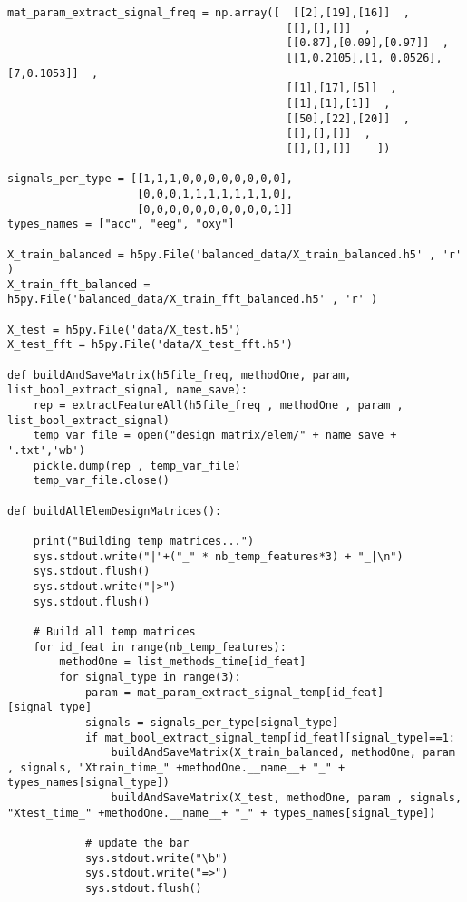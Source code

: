 \documentclass{article}
\begin{document}
\begin{lstlisting}
mat_param_extract_signal_freq = np.array([  [[2],[19],[16]]  ,
                                           [[],[],[]]  ,
                                           [[0.87],[0.09],[0.97]]  ,
                                           [[1,0.2105],[1, 0.0526],[7,0.1053]]  ,
                                           [[1],[17],[5]]  ,
                                           [[1],[1],[1]]  ,
                                           [[50],[22],[20]]  ,
                                           [[],[],[]]  ,
                                           [[],[],[]]    ])

signals_per_type = [[1,1,1,0,0,0,0,0,0,0,0],
                    [0,0,0,1,1,1,1,1,1,1,0],
                    [0,0,0,0,0,0,0,0,0,0,1]]
types_names = ["acc", "eeg", "oxy"]

X_train_balanced = h5py.File('balanced_data/X_train_balanced.h5' , 'r' )
X_train_fft_balanced = h5py.File('balanced_data/X_train_fft_balanced.h5' , 'r' )

X_test = h5py.File('data/X_test.h5')
X_test_fft = h5py.File('data/X_test_fft.h5')

def buildAndSaveMatrix(h5file_freq, methodOne, param, list_bool_extract_signal, name_save):
    rep = extractFeatureAll(h5file_freq , methodOne , param , list_bool_extract_signal)
    temp_var_file = open("design_matrix/elem/" + name_save + '.txt','wb')
    pickle.dump(rep , temp_var_file)
    temp_var_file.close()
    
def buildAllElemDesignMatrices():
    
    print("Building temp matrices...")
    sys.stdout.write("|"+("_" * nb_temp_features*3) + "_|\n")
    sys.stdout.flush()
    sys.stdout.write("|>")
    sys.stdout.flush()
    
    # Build all temp matrices
    for id_feat in range(nb_temp_features):
        methodOne = list_methods_time[id_feat]
        for signal_type in range(3):
            param = mat_param_extract_signal_temp[id_feat][signal_type]
            signals = signals_per_type[signal_type]
            if mat_bool_extract_signal_temp[id_feat][signal_type]==1:
                buildAndSaveMatrix(X_train_balanced, methodOne, param , signals, "Xtrain_time_" +methodOne.__name__+ "_" + types_names[signal_type])
                buildAndSaveMatrix(X_test, methodOne, param , signals, "Xtest_time_" +methodOne.__name__+ "_" + types_names[signal_type])
             
            # update the bar
            sys.stdout.write("\b")
            sys.stdout.write("=>")
            sys.stdout.flush()  
            

\end{lstlisting}
\end{document}
